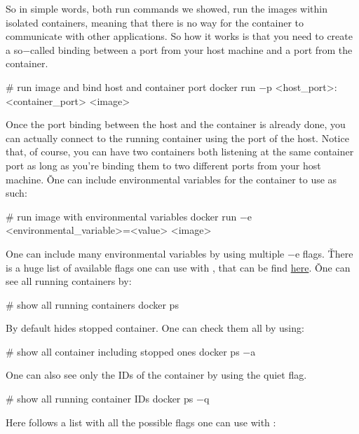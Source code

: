 So in simple words, both run commands we showed, run the images within isolated containers, meaning that there is no
way for the container to communicate with other applications. So how it works is that you need to create a
so$-$called binding between a port from your host machine and a port from the container.

\begin{bash}
# run image and bind host and container port
docker run $-$p <host_port>:<container_port> <image>
\end{bash}

Once the port binding between the host and the container is already done, you can actually connect to the running
container using the port of the host. Notice that, of course, you can have two containers both listening at the same
container port as long as you're binding them to two different ports from your host machine. \v

One can include environmental variables for the container to use as such:

\begin{bash}
# run image with environmental variables
docker run $-$e <environmental_variable>=<value> <image>
\end{bash}

One can include many environmental variables by using multiple $-$e flags. \v

There is a huge list of available flags one can use with , that can be find
\href{https://docs.docker.com/engine/reference/commandline/run/#options}{here}. \v

One can see all running containers by:

\begin{bash}
# show all running containers
docker ps
\end{bash}

By default  hides stopped container. One can check them all by using:

\begin{bash}
# show all container including stopped ones
docker ps $-$a
\end{bash}

One can also see only the IDs of the container by using the quiet  flag.

\begin{bash}
# show all running container IDs
docker ps $-$q
\end{bash}

Here follows a list with all the possible flags one can use with :

